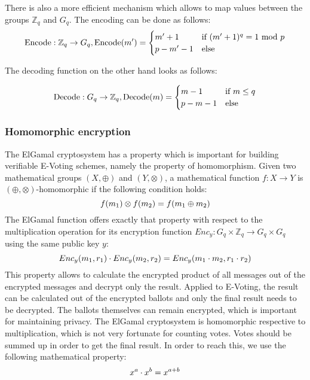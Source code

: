 \documentclass[numbers=noenddot, abstract=on]{scrreprt}
\begin{document}
There is also a more efficient mechanism which allows to
map values between the groups $\mathbb{Z}_q$ and $G_q$. The encoding can be done
as follows:
\begin{equation}
\text{Encode} : \mathbb{Z}_q \rightarrow G_q, \text{Encode}(m') = 
	\begin{cases}
	m'+1 & \text{if } (m'+1)^q = 1 \text{ mod } p \\
	p-m'-1 & \text{else}
	\end{cases} \notag
\end{equation}

The decoding function on the other hand looks as follows:

\begin{equation}
\text{Decode} : G_q \rightarrow \mathbb{Z}_q, \text{Decode}(m) = 
	\begin{cases}
	m-1 & \text{if } m \leq q \\
	p-m-1 & \text{else}
	\end{cases} \notag
\end{equation}

\subsubsection{Homomorphic encryption}
\label{sec:homenc}
The ElGamal cryptosystem has a property
which is important for building verifiable E-Voting schemes, namely the property
of homomorphism. Given two mathematical groups $(X,\oplus)$ and $(Y,\otimes)$, a
mathematical function $f:X \rightarrow Y$ is $(\oplus, \otimes)$-homomorphic if
the following condition holds:
\begin{equation}
f(m_1) \otimes f(m_2) = f(m_1 \oplus m_2) \notag
\end{equation}
The ElGamal function offers exactly that property with respect to the
multiplication operation for its encryption function $Enc_y:G_q \times
\mathbb{Z}_q \rightarrow G_q \times G_q$ using the same public key $y$:
\begin{equation}
Enc_y(m_1, r_1) \cdot Enc_y(m_2, r_2) = Enc_y(m_1 \cdot m_2, r_1 \cdot r_2)
\notag
\end{equation}
This property allows to calculate the encrypted product of all messages out of
the encrypted messages and decrypt only the result. Applied to E-Voting, the
result can be calculated out of the encrypted ballots and only the final result
needs to be decrypted. The ballots themselves can remain encrypted, which is
important for maintaining privacy. The ElGamal cryptosystem is homomorphic
respective to multiplication, which is not very fortunate for counting votes.
Votes should be summed up in order to get the final result. In order to reach
this, we use the following mathematical property:
\begin{equation}
x^a \cdot x^b = x^{a+b} \notag
\end{equation}
\end{document}
